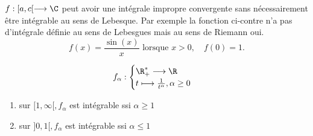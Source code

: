 \begin{minipage}{0.4\textwidth}  %
\end{minipage}%
\hfill
\begin{minipage}{0.55\textwidth}  %
    $f : [a,c[ \longrightarrow \C$ peut avoir une intégrale impropre convergente sans nécessairement être intégrable au sens de Lebesque. 
    Par exemple la fonction ci-contre n'a pas d'intégrale définie au sens de Lebesgues mais au sens de Riemann oui.
    \[
    f(x) = \frac{\sin(x)}{x} \text{ lorsque } x > 0, \quad f(0) = 1.
    \]
\end{minipage}


\begin{example}
    \[ f_\alpha :
        \begin{cases}
            \R_+^* \longrightarrow \R \\
            t \longmapsto \frac{1}{t^\alpha}, \alpha \ge 0
        \end{cases}
    \] 
    \begin{enumerate}
        \item sur $[1, \infty[, f_\alpha$ est intégrable ssi $\alpha \ge 1$
        \item sur $]0, 1[, f_\alpha$ est intégrable ssi $\alpha \le 1$
    \end{enumerate}
\end{example}


